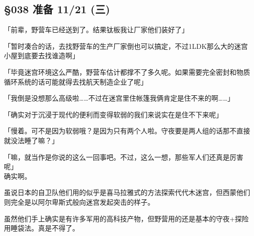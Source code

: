 \subsection{§038 准备 11/21 (三)}

「前辈，野营车已经送到了。结果钛板我让厂家他们装好了」

「暂时凑合的话，去找野营车的生产厂家倒也可以搞定，不过1LDK那么大的迷宫小屋到底要去找谁造啊」

「毕竟迷宫环境这么严酷，野营车估计都撑不了多久呢。如果需要完全密封和物质循环系统的话可能就得去找航天制造企业了呢」

「我倒是没想那么高级啦……不过在迷宫里住帐篷我俩肯定是住不来的啊……」

「确实对于沉浸于现代的便利而变得软弱的我们来说实在是住不下来呢」

「慢着。可不是因为软弱哦？是因为只有两个人啦。守夜要是两人组的话那不直接就没法睡了嘛？」

「嘛，就当作是你说的这么一回事吧。不过，这么一想，那些军人们还真是厉害呢」\\

确实啊。

虽说日本的自卫队他们用的似乎是喜马拉雅式的方法探索代代木迷宫，但西蒙他们则完全是以阿尔卑斯式般向迷宫发起突击的样子。

虽然他们手上确实是有许多军用的高科技产物，但野营用的还是基本的守夜+探险用睡袋法。真是不得了。\\

